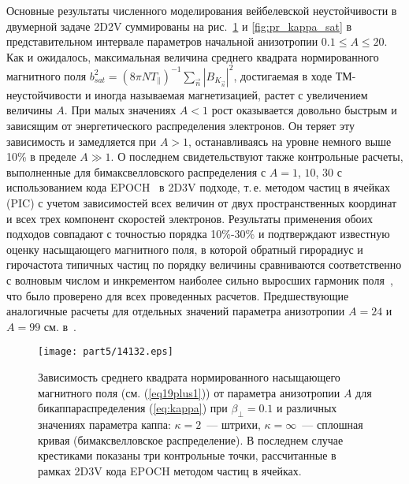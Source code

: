 Основные результаты численного моделирования вейбелевской неустойчивости в двумерной задаче 2D2V суммированы на рис.~\ref{fig:kappa_sat} и \ref{fig:pr_kappa_sat} в представительном интервале параметров начальной анизотропии $0.1\leq A \leq 20$. 
Как и ожидалось, максимальная величина среднего квадрата нормированного магнитного поля $b_{sat}^2 = {({8\pi N T_{\|}})^{-1}} \sum_{\vec{n}} {|B_{K_{\vec{n}}}|^{2}} $, достигаемая в ходе ТМ-неустойчивости и иногда называемая магнетизацией, растет с увеличением величины $A$. При малых значениях $A < 1$ рост оказывается довольно быстрым и зависящим от энергетического распределения электронов. Он теряет эту зависимость и замедляется при $A > 1$, останавливаясь на уровне немного выше 10\% в пределе $A \gg 1$. О последнем свидетельствуют также контрольные расчеты, выполненные для бимаксвелловского распределения с $A = 1$, $10$, $30$ с использованием кода EPOCH~\cite{Arber2015} в 2D3V подходе, т.\,е. методом частиц в ячейках (PIC) с учетом зависимостей всех величин от двух пространственных координат и всех трех компонент скоростей электронов. 
Результаты применения обоих подходов совпадают с точностью порядка 10\%-30\% и подтверждают известную оценку насыщающего магнитного поля, в которой обратный гирорадиус и гирочастота типичных частиц по порядку величины сравниваются соответственно с волновым числом и инкрементом наиболее сильно выросших гармоник поля~\cite{Borodachev2016_Radiofiz, Nechaev2019_Radiophys, Garasev2022_JPP}, что было проверено для всех проведенных расчетов. Предшествующие аналогичные расчеты для отдельных значений параметра анизотропии $A = 24$ и $A = 99$ см. в~\cite{Morse1971, Stockem2009}. 
\begin{figure}[h]

\texttt{[image: part5/14132.eps]}
\caption{Зависимость среднего квадрата нормированного насыщающего магнитного поля (см. (\ref{eq19plus1}))  от параметра анизотропии $A$ для бикаппа{\PunctumKappa}распределения (\ref{eq:kappa}) при $\beta_\perp=0.1$ и различных значениях параметра каппа:  $\kappa=2$~--- штрихи, $\kappa=\infty$~--- сплошная кривая (бимаксвелловское распределение). В последнем случае крестиками показаны три контрольные точки, рассчитанные в рамках 2D3V кода EPOCH методом частиц в ячейках.}
\label{fig:kappa_sat}
\end{figure}
